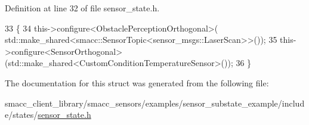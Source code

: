 Definition at line 32 of file sensor\+\_\+state.\+h.


\begin{DoxyCode}
33   \{
34     this->configure<ObstaclePerceptionOrthogonal>(
      std::make\_shared<smacc::SensorTopic<sensor\_msgs::LaserScan>>());
35     this->configure<SensorOrthogonal>(std::make\_shared<CustomConditionTemperatureSensor>());
36   \}
\end{DoxyCode}


The documentation for this struct was generated from the following file\+:\begin{DoxyCompactItemize}
\item 
smacc\+\_\+client\+\_\+library/smacc\+\_\+sensors/examples/sensor\+\_\+substate\+\_\+example/include/states/\hyperlink{sensor__state_8h}{sensor\+\_\+state.\+h}\end{DoxyCompactItemize}
